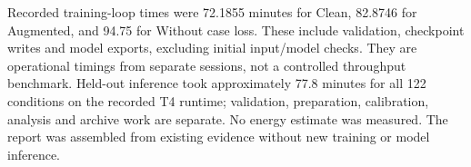 \documentclass{article}
\begin{document}
Recorded training-loop times were 72.1855 minutes for Clean, 82.8746 for
Augmented, and 94.75 for Without case loss. These include validation,
checkpoint writes and model exports, excluding initial input/model checks.
They are operational timings from separate sessions, not a controlled
throughput benchmark. Held-out inference took approximately 77.8 minutes
for all 122 conditions on the recorded T4 runtime; validation, preparation,
calibration, analysis and archive work are separate. No energy estimate was
measured. The report was assembled from existing evidence without new training
or model inference.

\end{document}

